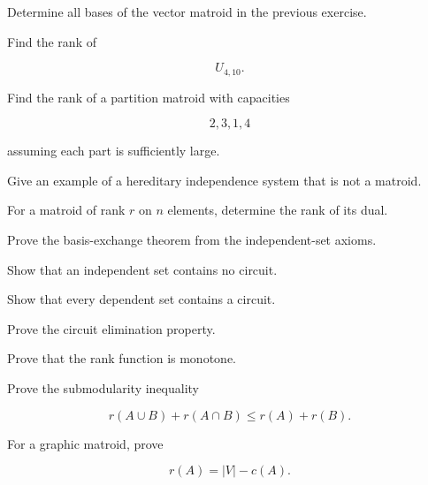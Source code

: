 \begin{exercise}[2]
Determine all bases of the vector matroid in the previous exercise.
\end{exercise}

\begin{exercise}[2]
Find the rank of

\[
U_{4,10}.
\]
\end{exercise}

\begin{exercise}[2]
Find the rank of a partition matroid with capacities

\[
2,3,1,4
\]

assuming each part is sufficiently large.
\end{exercise}

\begin{exercise}[2]
Give an example of a hereditary independence system that is not a
matroid.
\end{exercise}

\begin{exercise}[2]
For a matroid of rank \(r\) on \(n\) elements, determine the rank of
its dual.
\end{exercise}

\begin{exercise}[3]
Prove the basis-exchange theorem from the independent-set axioms.
\end{exercise}

\begin{exercise}[3]
Show that an independent set contains no circuit.
\end{exercise}

\begin{exercise}[3]
Show that every dependent set contains a circuit.
\end{exercise}

\begin{exercise}[3]
Prove the circuit elimination property.
\end{exercise}

\begin{exercise}[3]
Prove that the rank function is monotone.
\end{exercise}

\begin{exercise}[3]
Prove the submodularity inequality

\[
r(A\cup B)+r(A\cap B)
\leq
r(A)+r(B).
\]
\end{exercise}

\begin{exercise}[3]
For a graphic matroid, prove

\[
r(A)=|V|-c(A).
\]
\end{exercise}

